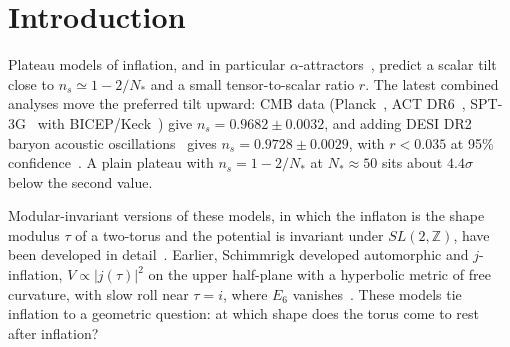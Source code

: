 \documentclass[aps,prd,twocolumn,superscriptaddress,nofootinbib,floatfix]{revtex4-2}
\begin{document}
\begin{abstract}
leptogenesis fails and $\delta_{CP}\in\{0,\pi\}$, so a discovery of leptonic CP violation would exclude that version. The tilt at $i$ and $\rho$ is fitted, as is a small symmetry-breaking parameter of the $\rho$ lepton sector, and the plateau itself is placed in the nilpotent sector by choice, as in other $SL(2,\mathbb{Z})$ attractors; we find no string origin for its form. The inflationary predictions were frozen with public hashes and will be scored only on future CMB and large-scale-structure data.
\end{abstract}
\maketitle

\section{Introduction}
Plateau models of inflation, and in particular $\alpha$-attractors~\cite{arXiv_1306_5220}, predict a scalar tilt close to $n_s \simeq 1-2/N_*$ and a small tensor-to-scalar ratio $r$. The latest combined analyses move the preferred tilt upward: CMB data (Planck~\cite{Planck2018X}, ACT DR6~\cite{arXiv_2503_14452}, SPT-3G~\cite{arXiv_2506_20707} with BICEP/Keck~\cite{arXiv_2110_00483}) give $n_s = 0.9682 \pm 0.0032$, and adding DESI DR2 baryon acoustic oscillations~\cite{arXiv_2503_14738} gives $n_s = 0.9728 \pm 0.0029$, with $r < 0.035$ at 95\% confidence~\cite{arXiv_2512_10613}. A plain plateau with $n_s=1-2/N_*$ at $N_* \approx 50$ sits about $4.4\sigma$ below the second value.

Modular-invariant versions of these models, in which the inflaton is the shape modulus $\tau$ of a two-torus and the potential is invariant under $SL(2,\mathbb{Z})$, have been developed in detail~\cite{arXiv_2408_05203,arXiv_2412_19324,arXiv_2405_06497,arXiv_2407_12081,arXiv_2411_18603}. Earlier, Schimmrigk developed automorphic and $j$-inflation, $V\propto|j(\tau)|^2$ on the upper half-plane with a hyperbolic metric of free curvature, with slow roll near $\tau=i$, where $E_6$ vanishes~\cite{arXiv_1512_09082,arXiv_1612_09559}. These models tie inflation to a geometric question: at which shape does the torus come to rest after inflation?
\end{document}
